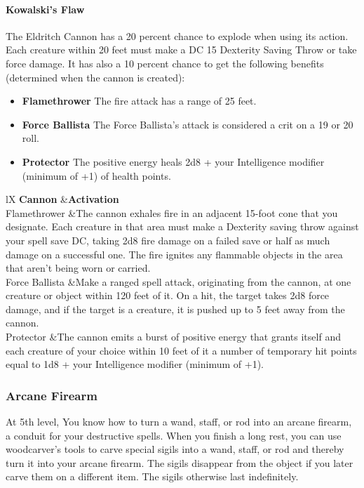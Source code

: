 {\paragraph*{Kowalski's Flaw}
The Eldritch Cannon has a  20 percent chance to explode when using its action. Each creature within 20 feet must make a DC 15 Dexterity Saving Throw or take  force damage. It has also a 10 percent chance to get the following  benefits (determined when the cannon is created):
\begin{itemize}
	\item \textbf{Flamethrower} The fire attack has a range of 25 feet.
	\item \textbf{Force Ballista} The Force Ballista's attack is considered a crit on a 19 or 20 roll.
	\item \textbf{Protector} The positive energy heals 2d8 + your Intelligence modifier (minimum of +1) of health points.
\end{itemize}
\begin{DndTable}[header=Eldritch Cannon]{lX}
\textbf{Cannon}  	&\textbf{Activation}				\\
Flamethrower		&The cannon exhales fire in an adjacent 15-foot cone that you designate. Each creature in that area must make a Dexterity saving throw against your spell save DC, taking 2d8 fire damage on a failed save or half as much damage on a successful one. The fire ignites any flammable objects in the area that aren't being worn or carried.\\
Force Ballista		&Make a ranged spell attack, originating from the cannon, at one creature or object within 120 feet of it. On a hit, the target takes 2d8 force damage, and if the target is a creature, it is pushed up to 5 feet away from the cannon.\\
Protector			&The cannon emits a burst of positive energy that grants itself and each creature of your choice within 10 feet of it a number of temporary hit points equal to 1d8 + your Intelligence modifier (minimum of +1).\\
\end{DndTable}

\subsubsection*{Arcane Firearm}
At 5th level, You know how to turn a wand, staff, or rod into an arcane firearm, a conduit for your destructive spells. When you finish a long rest, you can use woodcarver's tools to carve special sigils into a wand, staff, or rod and thereby turn it into your arcane firearm. The sigils disappear from the object if you later carve them on a different item. The sigils otherwise last indefinitely.

}
